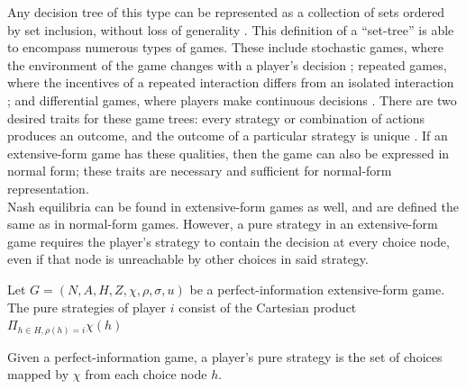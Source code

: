 Any decision tree of this type can be represented as a collection of sets ordered by set inclusion, without loss of generality \cite{alos08}. This definition of a ``set-tree'' is able to encompass numerous types of games. These include stochastic games, where the environment of the game changes with a player's decision \cite{sola15}; repeated games, where the incentives of a repeated interaction differs from an isolated interaction \cite{mail06}; and differential games, where players make continuous decisions \cite{alos08}. There are two desired traits for these game trees: every strategy or combination of actions produces an outcome, and the outcome of a particular strategy is unique \cite{alos08}. If an extensive-form game has these qualities, then the game can also be expressed in normal form; these traits are necessary and sufficient for normal-form representation.\\

Nash equilibria can be found in extensive-form games as well, and are defined the same as in normal-form games. However, a pure strategy in an extensive-form game requires the player's strategy to contain the decision at every choice node, even if that node is unreachable by other choices in said strategy.
\begin{define}
  Let $G = (N, A, H, Z, \chi, \rho, \sigma, u)$ be a perfect-information extensive-form game. The pure strategies of player $i$ consist of the Cartesian product $\Pi_{h\in H, \rho(h)=i}\chi(h)$
\end{define}

Given a perfect-information game, a player's pure strategy is the set of choices mapped by $\chi$ from each choice node $h$.